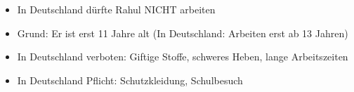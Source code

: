 \documentclass[12pt, a4paper]{article}
\begin{document}
    \vspace{0.5cm}
    
    \colorbox{comparecolor}{\makebox[\textwidth][c]{\large\textbf{\textcolor{white}{VERGLEICH DEUTSCHLAND:}}}}
    
    \begin{itemize}
        \item In Deutschland dürfte Rahul NICHT arbeiten
        \item Grund: Er ist erst 11 Jahre alt (In Deutschland: Arbeiten erst ab 13 Jahren)
        \item In Deutschland verboten: Giftige Stoffe, schweres Heben, lange Arbeitszeiten
        \item In Deutschland Pflicht: Schutzkleidung, Schulbesuch
    \end{itemize}
\end{document}

